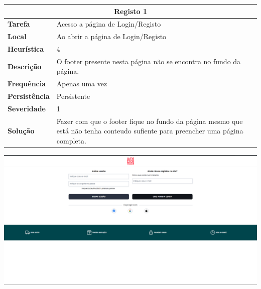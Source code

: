 \documentclass[a4paper,12pt]{article}
\begin{document}
\begin{center}

    \begin{table}[h!]
        \centering
        \begin{tabular}{|m{3cm}|m{12cm}|}
            \hline
            \multicolumn{2}{|c|}{\textbf{Registo 1}}                                                                                                               \\ \hline
            \textbf{Tarefa}       & Acesso a página de Login/Registo                                                                                               \\ \hline
            \textbf{Local}        & Ao abrir a página de Login/Registo                                                                                             \\ \hline
            \textbf{Heurística}   & 4                                                                                                                              \\ \hline
            \textbf{Descrição}    & O footer presente nesta página não se encontra no fundo da página.                                                             \\ \hline
            \textbf{Frequência}   & Apenas uma vez                                                                                                                 \\ \hline
            \textbf{Persistência} & Persistente                                                                                                                    \\ \hline
            \textbf{Severidade}   & 1                                                                                                                              \\ \hline
            \textbf{Solução}      & Fazer com que o footer fique no fundo da página mesmo que está não tenha conteudo sufiente para preencher uma página completa. \\ \hline
        \end{tabular}
    \end{table}

    \vspace{0.5cm}
    \includegraphics[width=\textwidth, keepaspectratio]{heuristics/01footer_registo.png}



\end{center}
\end{document}
